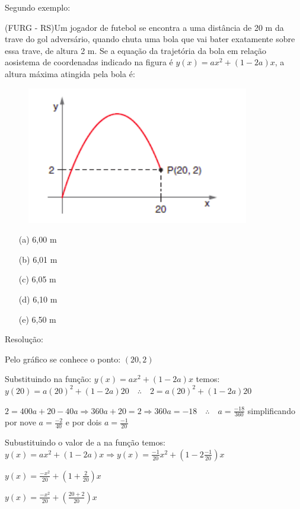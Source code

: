 \begin{multicols*}{2}
    Segundo exemplo:

    (FURG - RS)Um jogador de futebol se encontra a uma distância de 20 m da trave do gol 					adversário, quando chuta uma bola que vai bater exatamente sobre essa trave, de altura 2 m. Se 			a equação da trajetória da bola em relação aosistema de coordenadas indicado na figura é
    $y(x) = ax^2 + (1-2a)x$, a altura máxima atingida pela bola é:
    \begin{figure}[H]
        \centering
        \includegraphics[scale=0.5]{assets/rafael/img20.png}
    \end{figure}
    \begin{itemize}
        \item[(a)] 6,00 m
        \item[(b)] 6,01 m
        \item[(c)] 6,05 m
        \item[(d)] 6,10 m
        \item[(e)] 6,50 m
    \end{itemize}
    Resolução:

    Pelo gráfico se conhece o ponto: $(20,2)$

    Substituindo na função: $y(x) = ax^2 + (1-2a)x$ temos: $y(20) = a(20)^2 + (1-2a)20 \quad 				\therefore	\quad 2  = a(20)^2 + (1-2a)20 $

    $2 = 400a + 20 - 40a \Rightarrow 360a + 20 = 2 \Rightarrow 360a = -18 \quad \therefore \quad
        a = \frac{-18}{ 360}$ simplificando por nove $a = \frac{-2}{ 40}$ e por dois
    $a = \frac{-1}{ 20}$

    Subustituindo o valor de a na função temos:
    $y(x) = ax^2 + (1-2a)x \Rightarrow y(x) = \frac{-1}{20} x^2 + \left( 1-2 \frac{-1}{20}
        \right)x $


    $y(x) = \frac{-x^2}{20} + \left( 1 + \frac{2}{20} \right)x$

    $y(x) = \frac{-x^2}{20} + \left(  \frac{20 +2 }{20} \right)x$


\end{multicols*}
